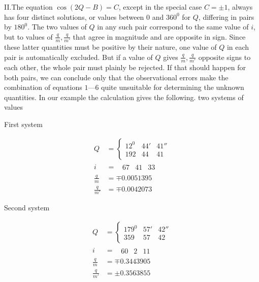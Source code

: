 II.\quad The equation $\cos(2Q-B)=C$, except in the special case $C=\pm1$, always has four distinct solutions, or values between $0$ and $360^0$ for $Q$, differing in pairs by $180^0$. The two values of $Q$ in any such pair correspond to the same value of $i$, but to values of $\frac{q}{m},\frac{q}{m'}$ that agree in magnitude and are opposite in sign. Since these latter quantities must be positive by their nature, one value of $Q$ in each pair is automatically excluded. But if a value of $Q$ gives $\frac{q}{m},\frac{q}{m'}$ opposite signs to each other, the whole pair must plainly be rejected. If that should happen for both pairs, we can conclude only that the observational errors make the combination of equations $1$---$6$ quite unsuitable for determining the unknown quantities. In our example the calculation gives the following. two systems of values
\begin{center}First system\end{center}
\[
\begin{aligned}
Q&=\left\{\begin{array}{rrr}12^0&44'&41''\\192&44&41\end{array}\right.\\
i&=\phantom{\{}\begin{array}{rrr}67&41&33\end{array}\\
\frac{q}{m}&=\mp0.0051395\\
\frac{q}{m'}&=\mp0.0042073
\end{aligned}
\]
\begin{center}Second system\end{center}
\[
\begin{aligned}
Q&=\left\{\begin{array}{rrr}179^0&57'&42''\\359&57&42\end{array}\right.\\
i&=\phantom{\{}\begin{array}{rrr}60&2&11\end{array}\\
\frac{q}{m}&=\mp0.3443905\\
\frac{q}{m'}&=\pm0.3563855
\end{aligned}
\]

